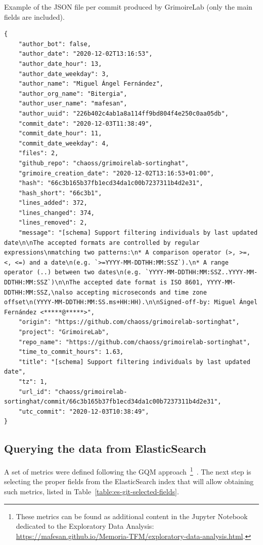 \documentclass[a4paper, 12pt]{book}
\begin{document}
\begin{listing}[h!]
    \caption{Example of the JSON file per commit produced by GrimoireLab (only the main fields are included).}{}
    \label{lst:git-elasticsearch}
    \begin{verbatim}
{
    "author_bot": false,
    "author_date": "2020-12-02T13:16:53",
    "author_date_hour": 13,
    "author_date_weekday": 3,
    "author_name": "Miguel Ángel Fernández",
    "author_org_name": "Bitergia",
    "author_user_name": "mafesan",
    "author_uuid": "226b402c4ab1a8a114ff9bd804f4e250c0aa05db",
    "commit_date": "2020-12-03T11:38:49",
    "commit_date_hour": 11,
    "commit_date_weekday": 4,
    "files": 2,
    "github_repo": "chaoss/grimoirelab-sortinghat",
    "grimoire_creation_date": "2020-12-02T13:16:53+01:00",
    "hash": "66c3b165b37fb1ecd34da1c00b7237311b4d2e31",
    "hash_short": "66c3b1",
    "lines_added": 372,
    "lines_changed": 374,
    "lines_removed": 2,
    "message": "[schema] Support filtering individuals by last updated date\n\nThe accepted formats are controlled by regular expressions\nmatching two patterns:\n* A comparison operator (>, >=, <, <=) and a date\n(e.g. `>=YYYY-MM-DDTHH:MM:SSZ`).\n* A range operator (..) between two dates\n(e.g. `YYYY-MM-DDTHH:MM:SSZ..YYYY-MM-DDTHH:MM:SSZ`)\n\nThe accepted date format is ISO 8601, YYYY-MM-DDTHH:MM:SSZ,\nalso accepting microseconds and time zone offset\n(YYYY-MM-DDTHH:MM:SS.ms+HH:HH).\n\nSigned-off-by: Miguel Ángel Fernández <*****@*****>",
    "origin": "https://github.com/chaoss/grimoirelab-sortinghat",
    "project": "GrimoireLab",
    "repo_name": "https://github.com/chaoss/grimoirelab-sortinghat",
    "time_to_commit_hours": 1.63,
    "title": "[schema] Support filtering individuals by last updated date",
    "tz": 1,
    "url_id": "chaoss/grimoirelab-sortinghat/commit/66c3b165b37fb1ecd34da1c00b7237311b4d2e31",
    "utc_commit": "2020-12-03T10:38:49",
}
    \end{verbatim}
\end{listing}

\subsection{Querying the data from ElasticSearch}
\label{ssec:querying-es}

A set of metrics were defined following the GQM approach~\footnote{These metrics can be found as  additional content in the Jupyter Notebook dedicated to the Exploratory Data Analysis: \url{https://mafesan.github.io/Memoria-TFM/exploratory-data-analysis.html}.}~\cite{Basili94-gqm}. The next step is selecting the proper fields from the ElasticSearch index that will allow obtaining such metrics, listed in Table~\ref{table:es-git-selected-fields}.
\end{document}
